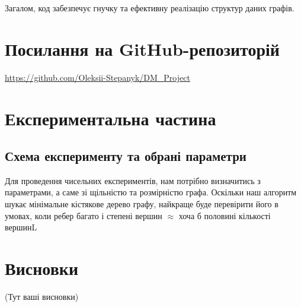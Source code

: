 \documentclass[12pt, letterpaper, twoside]{article}
\begin{document}
Загалом, код забезпечує гнучку та ефективну реалізацію структур даних графів.



\section{Посилання на GitHub-репозиторій}
\url{https://github.com/Oleksii-Stepanyk/DM_Project}

\section{Експериментальна частина}
\centering \subsection*{Схема експерименту та обрані параметри}
\begin{flushleft}
	Для проведення чисельних експериментів, нам потрібно визначитись з параметрами, а саме зі щільністю та розмірністю графа.
	Оскільки наш алгоритм шукає мінімальне кістякове дерево графу, найкраще буде перевірити його в умовах, коли ребер багато і степені вершин $\approx$ хоча б половині кількості вершинL
\end{flushleft}

\section{Висновки}

(Тут ваші висновки)
\end{document}
